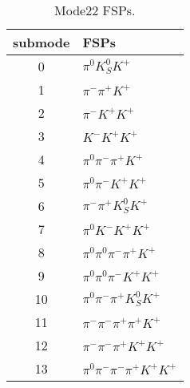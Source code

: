 \begin{table}[h!]
\begin{center}
\begin{tabular}{cl}
\hline
submode& FSPs\\
\hline
0 & $\pi^0 K_S^0 K^+ $ \\
1 & $\pi^- \pi^+ K^+ $ \\
2 & $\pi^- K^+ K^+ $ \\
3 & $K^- K^+ K^+ $ \\
4 & $\pi^0 \pi^- \pi^+ K^+ $ \\
5 & $\pi^0 \pi^- K^+ K^+ $ \\
6 & $\pi^- \pi^+ K_S^0 K^+ $ \\
7 & $\pi^0 K^- K^+ K^+ $ \\
8 & $\pi^0 \pi^0 \pi^- \pi^+ K^+ $ \\
9 & $\pi^0 \pi^0 \pi^- K^+ K^+ $ \\
10 & $\pi^0 \pi^- \pi^+ K_S^0 K^+ $ \\
11 & $\pi^- \pi^- \pi^+ \pi^+ K^+ $ \\
12 & $\pi^- \pi^- \pi^+ K^+ K^+ $ \\
13 & $\pi^0 \pi^- \pi^- \pi^+ K^+ K^+ $ \\
\hline
\end{tabular}
\label{tab:Mode22FSPs}
\caption{Mode22 FSPs.}
\end{center}
\end{table}

